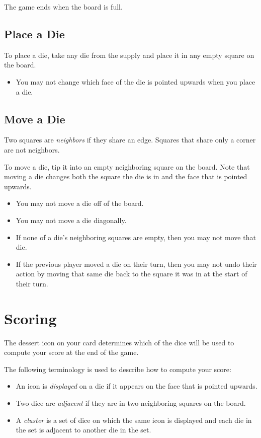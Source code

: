 \documentclass[a6paper, 11pt, parskip=half, DIV=15]{scrartcl}
\begin{document}
The game ends when the board is full. 

\subsection*{Place a Die}
To place a die, take any die from the supply and place it in any empty square on the board.

\begin{itemize}
	\item You may not change which face of the die is pointed upwards when you place a die.
\end{itemize}

\newpage
\enlargethispage{1.75\baselineskip}
\subsection*{Move a Die}
Two squares are \emph{neighbors} if they share an edge. Squares that share only a corner are not neighbors.

To move a die, tip it into an empty neighboring square on the board. Note that moving a die changes both the square the die is in and the face that is pointed upwards.

\begin{itemize}
    \item You may not move a die off of the board.
    \item You may not move a die diagonally.
    \item If none of a die's neighboring squares are empty, then you may not move that die.
    \item If the previous player moved a die on their turn, then you may not undo their action by moving that same die back to the square it was in at the start of their turn.
\end{itemize}

\newpage
\enlargethispage{1.75\baselineskip}
\section*{Scoring}
The dessert icon on your card determines which of the dice will be used to compute your score at the end of the game.

The following terminology is used to describe how to compute your score:
\begin{itemize}
	\item An icon is \emph{displayed} on a die if it appears on the face that is pointed upwards.
    \item Two dice are \emph{adjacent} if they are in two neighboring squares on the board.
    \item A \emph{cluster} is a set of dice on which the same icon is displayed and each die in the set is adjacent to another die in the set. 
\end{itemize}
\end{document}
